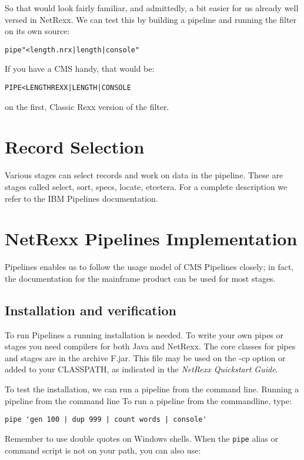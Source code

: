 So that would look fairly familiar, and admittedly, a bit easier for us already well versed in NetRexx.
We can test this by building a pipeline and running the filter on its
own source:
\begin{alltt}
pipe "<length.nrx | length | console"
 \end{alltt}
If you have a CMS handy, that would be:
\begin{alltt}
  PIPE < LENGTH REXX | LENGTH | CONSOLE
 \end{alltt}
on the first, Classic Rexx version of the filter.


\chapter{Record Selection}
Various stages can select records and work on data in the
pipeline. These are stages called select, sort, specs, locate,
etcetera. For a complete description we refer to the IBM Pipelines
documentation. 

\chapter{NetRexx Pipelines Implementation}
\nr{} Pipelines enables us to follow the usage model of CMS Pipelines
closely; in fact, the documentation for the mainframe product can be
used for most stages.

\section{Installation and verification}
To run \nr{} Pipelines a running \nr{} installation is needed.  To write your own pipes or stages you need compilers for both Java and NetRexx. 
The core classes for pipes and stages are in the archive \nr{}F.jar.  This file may
be used on the -cp option or added to your CLASSPATH, as indicated in
the \emph{NetRexx Quickstart Guide}.

To test the installation, we can run a pipeline from the command line.
Running a pipeline from the command line
 To run a pipeline from the commandline, type:
\begin{lstlisting}[label=countwords,caption=Count Words]
pipe 'gen 100 | dup 999 | count words | console'
\end{lstlisting}

Remember to use double quotes on Windows shells. When the \texttt{pipe}
alias or command script is not on your path, you can also use:

